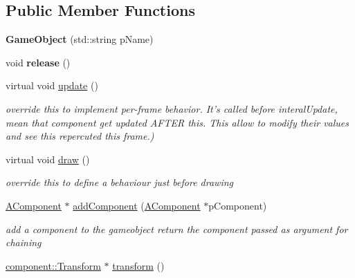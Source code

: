 \subsection*{\-Public \-Member \-Functions}
\begin{DoxyCompactItemize}
\item 
\hypertarget{classde_1_1_game_object_a68be8d3d6c07b8ffddb22b7758a36b51}{
{\bfseries \-Game\-Object} (std\-::string p\-Name)}
\label{classde_1_1_game_object_a68be8d3d6c07b8ffddb22b7758a36b51}

\item 
\hypertarget{classde_1_1_game_object_a7cf452c9ec1ad16d2f45d493f51974a7}{
void {\bfseries release} ()}
\label{classde_1_1_game_object_a7cf452c9ec1ad16d2f45d493f51974a7}

\item 
\hypertarget{classde_1_1_game_object_adaa68cb3c475ade540ab527543210096}{
virtual void \hyperlink{classde_1_1_game_object_adaa68cb3c475ade540ab527543210096}{update} ()}
\label{classde_1_1_game_object_adaa68cb3c475ade540ab527543210096}

\begin{DoxyCompactList}\small\item\em override this to implement per-\/frame behavior. \-It's called before interal\-Update, mean that component get updated \-A\-F\-T\-E\-R this. \-This allow to modify their values and see this repercuted this frame.) \end{DoxyCompactList}\item 
\hypertarget{classde_1_1_game_object_a7530cc647d3c51516a710dd91cc99c09}{
virtual void \hyperlink{classde_1_1_game_object_a7530cc647d3c51516a710dd91cc99c09}{draw} ()}
\label{classde_1_1_game_object_a7530cc647d3c51516a710dd91cc99c09}

\begin{DoxyCompactList}\small\item\em override this to define a behaviour just before drawing \end{DoxyCompactList}\item 
\hypertarget{classde_1_1_game_object_a113db17ce4217a18053e4125a936eb41}{
\hyperlink{classde_1_1_a_component}{\-A\-Component} $\ast$ \hyperlink{classde_1_1_game_object_a113db17ce4217a18053e4125a936eb41}{add\-Component} (\hyperlink{classde_1_1_a_component}{\-A\-Component} $\ast$p\-Component)}
\label{classde_1_1_game_object_a113db17ce4217a18053e4125a936eb41}

\begin{DoxyCompactList}\small\item\em add a component to the gameobject return the component passed as argument for chaining \end{DoxyCompactList}\item 
\hypertarget{classde_1_1_game_object_a6f25a7fe1d2ec1ae206a8dc52733a4d6}{
\hyperlink{classde_1_1component_1_1_transform}{component\-::\-Transform} $\ast$ \hyperlink{classde_1_1_game_object_a6f25a7fe1d2ec1ae206a8dc52733a4d6}{transform} ()}
\label{classde_1_1_game_object_a6f25a7fe1d2ec1ae206a8dc52733a4d6}


\end{DoxyCompactItemize}
